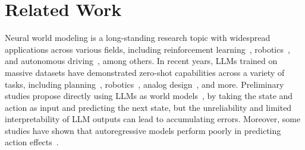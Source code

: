 \section{Related Work}
Neural world modeling is a long-standing research topic with widespread applications across various fields, including reinforcement learning~\citep{ha2018world, ha2018recurrent}, robotics~\citep{wu2023daydreamer}, and autonomous driving~\citep{guan2024world}, among others.
In recent years, LLMs trained on massive datasets have demonstrated zero-shot capabilities across a variety of tasks, including planning~\cite{zhao2023survey,qin2024large,huang2022language,hu2024hiagent}, robotics~\cite{mu2024robocodex,chen2024textbfemostextbfembodimentawareheterogeneoustextbfmultirobot}, analog design~\cite{lai2024analogcoder}, and more.
Preliminary studies propose directly using LLMs as world models~\citep{hao2023reasoning,wang2024can,wang2023promptagent,li2022emergent}, by taking the state and action as input and predicting the next state, but the unreliability and limited interpretability of LLM outputs can lead to accumulating errors.
Moreover, some studies have shown that autoregressive models perform poorly in predicting action effects~\cite{banerjee2020can,luo2023towards}.
